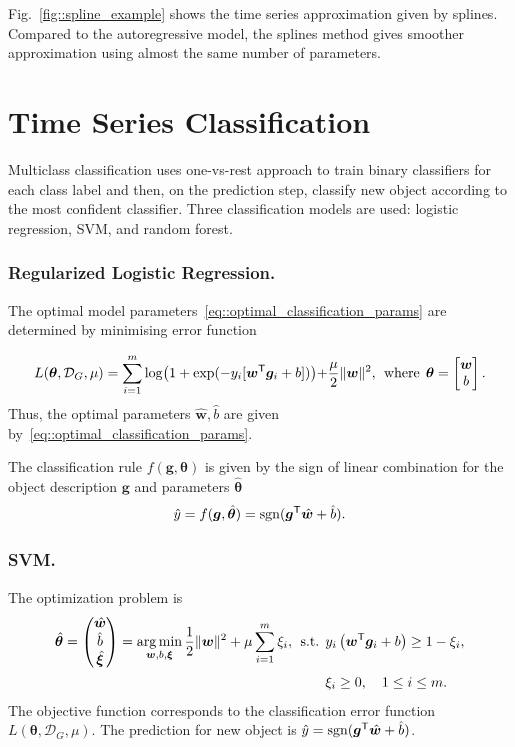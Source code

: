 \documentclass{llncs}
\DeclareMathOperator{\sgn}{\mathop{sgn}}
\DeclareMathOperator*{\argmin}{arg\,min}
\newcommand{\T}{{\mbox{\scriptsize\sffamily\upshape\mdseries T}}}
\begin{document}
Fig.~\ref{fig::spline_example} shows the time series approximation given by splines. 
Compared to the autoregressive model, the splines method gives smoother approximation using almost the same number of parameters.

\section{Time Series Classification}
Multiclass classification uses one-vs-rest approach to train binary classifiers for each class label and then, on the prediction step, classify new object according to the most confident classifier. Three classification models are used: logistic regression, SVM, and random forest.

\subsubsection{Regularized Logistic Regression.}
The optimal model parameters~\eqref{eq::optimal_classification_params} are determined by minimising error function

\begin{equation*}
L(\bm{\theta}, \mathcal{D}_G, \mu) = \sum_{i=1}^{m} \log\bigl(1 + \exp(-y_i [\bm{w}^{\T} \bm{g}_i + b])\bigl) + \frac{\mu}{2} \|\bm{w}\|^2, \:\:\mbox{where}\:\: \bm{\theta}  = \begin{bmatrix}
\bm{w} \\ b
\end{bmatrix}.
\end{equation*}
Thus, the optimal parameters $\hat{\bm{w}}, \hat{b}$ are given by~\eqref{eq::optimal_classification_params}.

The classification rule $f(\bm{g}, \bm{\theta})$ is given by the sign of linear combination for the object description $\bm{g}$ and parameters $\hat{\bm{\theta}}$
\begin{equation*}
\hat{y} = f(\bm{g}, \hat{\bm{\theta}}) = \sgn(\bm{g}^{\T} \hat{\bm{w}} + \hat{b}).
\end{equation*}

\subsubsection{SVM.}
The optimization problem is
\begin{align*}
\hat{\bm{\theta}}  = \begin{pmatrix}
\hat{\bm{w}} \\ \hat{b} \\ \hat{\bm{\xi}}
\end{pmatrix}= \argmin_{\bm{w}, b, \bm{\xi}}  \frac{1}{2} \|\bm{w}\|^2 + \mu \sum_{i=1}^{m} \xi_i,\:\:
\mbox{s.t.} \:\: &y_i \left(\bm{w}^{\T} \bm{g}_i + b\right) \geq 1 - \xi_i,\\
&\xi_i \geq 0, \quad 1 \leq i \leq m.
\end{align*}
The objective function corresponds to the classification error function $L(\bm{\theta}, \mathcal{D}_G, \mu)$.
The prediction for new object is $
\hat{y} = \sgn (\bm{g}^{\T} \hat{\bm{w}} + \hat{b})$.
\end{document}
